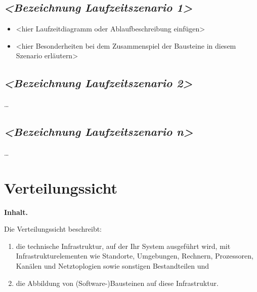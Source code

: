 \documentclass[]{article}
\begin{document}
\subsection{\texorpdfstring{\emph{\textless{}Bezeichnung
Laufzeitszenario
1\textgreater{}}}{\textless{}Bezeichnung Laufzeitszenario 1\textgreater{}}}\label{__emphasis_bezeichnung_laufzeitszenario_1_emphasis}

\begin{itemize}
\item
  \textless{}hier Laufzeitdiagramm oder Ablaufbeschreibung
  einfügen\textgreater{}
\item
  \textless{}hier Besonderheiten bei dem Zusammenspiel der Bausteine in
  diesem Szenario erläutern\textgreater{}
\end{itemize}

\subsection{\texorpdfstring{\emph{\textless{}Bezeichnung
Laufzeitszenario
2\textgreater{}}}{\textless{}Bezeichnung Laufzeitszenario 2\textgreater{}}}\label{__emphasis_bezeichnung_laufzeitszenario_2_emphasis}

\ldots{}

\subsection{\texorpdfstring{\emph{\textless{}Bezeichnung
Laufzeitszenario
n\textgreater{}}}{\textless{}Bezeichnung Laufzeitszenario n\textgreater{}}}\label{__emphasis_bezeichnung_laufzeitszenario_n_emphasis}

\ldots{}

\section{Verteilungssicht}\label{section-deployment-view}

\textbf{Inhalt.}

Die Verteilungssicht beschreibt:

\begin{enumerate}
\def\labelenumi{\arabic{enumi}.}
\item
  die technische Infrastruktur, auf der Ihr System ausgeführt wird, mit
  Infrastrukturelementen wie Standorte, Umgebungen, Rechnern,
  Prozessoren, Kanälen und Netztoplogien sowie sonstigen Bestandteilen
  und
\item
  die Abbildung von (Software-)Bausteinen auf diese Infrastruktur.
\end{enumerate}
\end{document}
